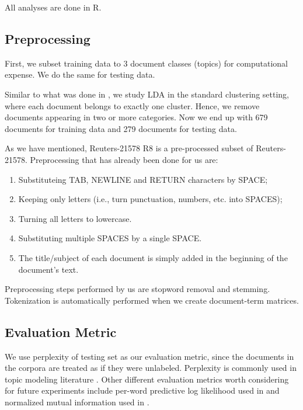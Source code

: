 \documentclass{article}
\begin{document}
All analyses are done in R.

\subsection{Preprocessing}

First, we subset training data to 3 document classes (topics) for computational expense. We do the same for testing data.

Similar to what was done in \cite{lu2011investigating}, we study LDA in the standard clustering setting, where each document belongs to exactly one cluster. Hence, we remove documents appearing in two or more categories. Now we end up with 679 documents for training data and 279 documents for testing data.

As we have mentioned, Reuters-21578 R8 is a pre-processed subset of Reuters-21578. Preprocessing that has already been done for us are:

\begin{enumerate}
  \item Substituteing TAB, NEWLINE and RETURN characters by SPACE;
  \item Keeping only letters (i.e., turn punctuation, numbers, etc. into SPACES);
  \item Turning all letters to lowercase.
  \item Substituting multiple SPACES by a single SPACE.
  \item The title/subject of each document is simply added in the beginning of the document's text.
\end{enumerate}

Preprocessing steps performed by us are stopword removal and stemming. Tokenization is automatically performed when we create document-term matrices.


\subsection{Evaluation Metric}

We use perplexity of testing set as our evaluation metric, since the documents in the corpora are treated as if they were unlabeled. Perplexity is commonly used in topic modeling literature \cite{blei2003latent,blei2007correlated}. Other different evaluation metrics worth considering for future experiments include per-word predictive log likelihood used in \cite{wang2018general} and normalized mutual information used in \cite{lu2011investigating}.
\end{document}
